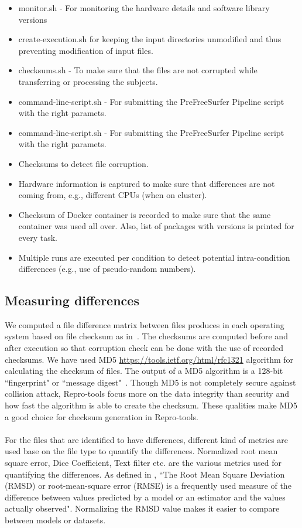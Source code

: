 \documentclass{article}
\begin{document}
\begin{itemize}
  \item monitor.sh - For monitoring the hardware details and software library versions
  \item create-execution.sh for keeping the input directories unmodified and thus preventing modification of input files.
  \item checksums.sh - To make sure that the files are not corrupted while transferring or processing the subjects.
  \item command-line-script.sh - For submitting the PreFreeSurfer Pipeline script with the right paramets.
  \item command-line-script.sh - For submitting the PreFreeSurfer Pipeline script with the right paramets.
  \item Checksums to detect file corruption.
  \item Hardware information is captured to make sure that differences are not coming from, e.g., different CPUs (when on cluster).
  \item Checksum of Docker container is recorded to make sure that the same container was used all over. Also, list of packages with versions is printed for every task. 
  \item Multiple runs are executed per condition to detect potential intra-condition differences (e.g., use of pseudo-random numbers).
\end{itemize}

\subsection{Measuring differences}

We computed a file difference matrix between files produces in each operating system based on file checksum as in~\cite{Scaria2017}.
 The checksums are computed before and after execution so that corruption check can be done with the use of recorded checksums.
 We have used MD5 {\url{https://tools.ietf.org/html/rfc1321}} algorithm for calculating the checksum of files. 
The output of a MD5 algorithm is a 128-bit ``fingerprint" or ``message digest"~\cite{md5}. 
Though MD5 is not completely secure against collision attack, Repro-tools focus more on the data integrity than security 
and how fast the algorithm is able to create the checksum. These qualities make MD5 a good choice for checksum generation in Repro-tools.
\paragraph{} For the files that are identified to have differences, different kind of metrics are used base on the file 
type to quantify the differences. Normalized root mean square error, Dice Coefficient, Text filter etc. are the 
various metrics used for quantifying the differences. As defined in \cite{khosrow2017handbook}, ``The Root Mean Square Deviation (RMSD) 
or root-mean-square error (RMSE) is a frequently used measure of the difference between values predicted by a model or 
an estimator and the values actually observed". Normalizing the RMSD value makes it easier to compare between models or datasets.
\end{document}
